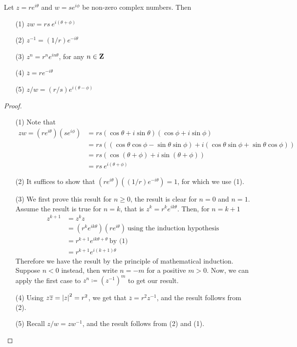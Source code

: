 
\begin{proposition}\label{propeuler}
Let $z = re^{i\theta}$ and $w = se^{i\phi}$ be non-zero complex numbers. Then
\begin{itemize}
\item[(1)] $zw = rs\  e^{i(\theta + \phi)}$
\item[(2)] $z^{-1} = (1/r) e^{-i\theta}$
\item[(3)] $z^n = r^n e^{in\theta}$, for any $n \in \mathbf Z$
\item[(4)] $\overline{z} = re^{-i\theta}$
\item[(5)] $z/w = (r/s)e^{i(\theta - \phi)}$
\end{itemize}
\end{proposition}
\begin{proof}\hfill
\begin{itemize}
\item[(1)] Note that
\begin{align*}
zw = (re^{i\theta})(se^{i\phi})&= rs(\cos\theta + i\sin\theta)(\cos\phi + i\sin\phi)\\[0.5em]
&= rs((\cos\theta\cos\phi - \sin\theta\sin\phi) + i(\cos\theta\sin\phi + \sin\theta\cos\phi))\\[0.5em]
&= rs(\cos(\theta + \phi) + i\sin(\theta + \phi))\\[0.5em]
&= rs\  e^{i(\theta + \phi)}
\end{align*}
\item[(2)] It suffices to show that $(re^{i\theta})((1/r) e^{-i\theta}) = 1$, for which we use (1).
\item[(3)] We first prove this result for $n \geq 0$, the result is clear for $n = 0$ and $n = 1$. Assume the result is true for $n = k$, that is $z^k = r^k e^{ik\theta}$. Then, for $n = k+1$
\begin{align*}
z^{k+1} &= z^kz\\[0.5em]
&= (r^k e^{ik\theta})(re^{i\theta})\ \text{using the induction hypothesis}\\[0.5em]
&= r^{k+1} e^{ik\theta+\theta}\ \text{by (1)}\\[0.5em]
&= r^{k+1} e^{i(k+1)\theta}
\end{align*}
Therefore we have the result by the principle of mathematical induction.\\[0.5em]
Suppose $n<0$ instead, then write $n = -m$ for a positive $m>0$. Now, we can apply the first case to $z^n \coloneqq (z^{-1})^m$ to get our result.
\item[(4)] Using $z\overline{z} = \left\lvert z\right\rvert^2 = r^2$, we get that $\overline{z} = r^2z^{-1}$, and the result follows from (2).
\item[(5)] Recall $z/w = zw^{-1}$, and the result follows from (2) and (1).
\end{itemize}
\vspace*{-\baselineskip}
\end{proof}


